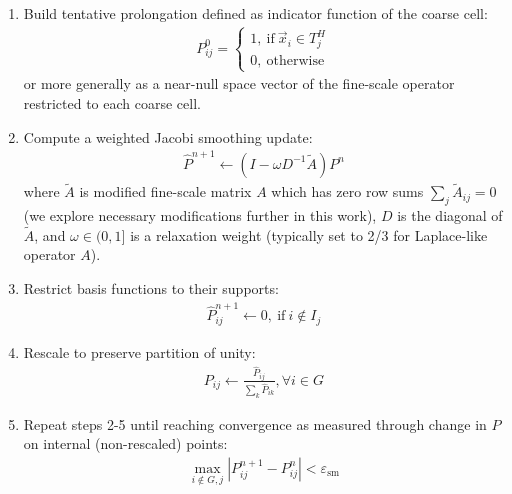 \begin{enumerate}
    \item Build tentative prolongation defined as indicator function of the coarse cell:
    \begin{align}
        P^0_{ij} =
        \begin{cases}
        1, \:\text{if}\:\vec{x}_i \in T_j^H \\
        0, \:\text{otherwise}
        \end{cases}
    \end{align}
    or more generally as a near-null space vector of the fine-scale operator restricted to each coarse cell.
    \item Compute a weighted Jacobi smoothing update:
    \begin{align}
        \widehat{P}^{n+1} \leftarrow (I - \omega D^{-1} \widetilde{A}) P^n \label{eq:msrsb_update}
    \end{align}
    where $\widetilde{A}$ is modified fine-scale matrix $A$ which has zero row sums $\sum_j \widetilde{A}_{ij} = 0$ (we explore necessary modifications further in this work), $D$ is the diagonal of $\widetilde{A}$, and $\omega \in (0,1]$ is a relaxation weight (typically set to 2/3 for Laplace-like operator $A$).  
    \item Restrict basis functions to their supports:
    \begin{align}
        \widehat{P}^{n+1}_{ij} \leftarrow 0, \:\text{if}\: i \notin I_j \label{eq:msrsb_restrict}
    \end{align}
    \item Rescale to preserve partition of unity:
    \begin{align}
        P_{ij} \leftarrow \frac{\widehat{P}_{ij}}{\sum\limits_{k}\widehat{P}_{ik}}, \forall i \in G \label{eq:msrsb_rescale}
    \end{align}
    \item Repeat steps 2-5 until reaching convergence as measured through change in $P$ on internal (non-rescaled) points:
    \begin{align}
        \max\limits_{i \notin G, j}|P^{n+1}_{ij} - P^{n}_{ij}| < \varepsilon_{\text{sm}} \label{eq:msrsb_check}
    \end{align}
\end{enumerate}

